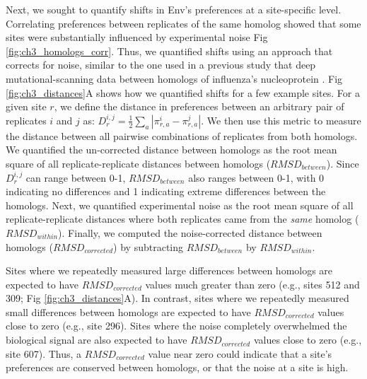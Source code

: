 \documentclass[9pt]{elife}
\begin{document}
Next, we sought to quantify shifts in Env's preferences at a site-specific level.
Correlating preferences between replicates of the same homolog showed that some sites were substantially influenced by experimental noise Fig \ref{fig:ch3_homologs_corr}.
Thus, we quantified shifts using an approach that corrects for noise, similar to the one used in a previous study that deep mutational-scanning data between homologs of influenza's nucleoprotein \cite{doud2015site}.
Fig \ref{fig:ch3_distances}A shows how we quantified shifts for a few example sites.
For a given site $r$, we define the distance in preferences between an arbitrary pair of replicates $i$ and $j$ as: $D_{r}^{i,j} = \frac{1}{2}\sum_{a}|\pi_{r,a}^{i}-\pi_{r,a}^{j}|$.
We then use this metric to measure the distance between all pairwise combinations of replicates from both homologs.
We quantified the un-corrected distance between homologs as the root mean square of all replicate-replicate distances between homologs ($RMSD_{between}$).
Since $D_{r}^{i,j}$ can range between 0-1, $RMSD_{between}$ also ranges between 0-1, with 0 indicating no differences and 1 indicating extreme differences between the homologs.
Next, we quantified experimental noise as the root mean square of all replicate-replicate distances where both replicates came from the \textit{same} homolog ($RMSD_{within}$).
Finally, we computed the noise-corrected distance between homologs ($RMSD_{corrected}$) by subtracting $RMSD_{between}$ by $RMSD_{within}$.

Sites where we repeatedly measured large differences between homologs are expected to have $RMSD_{corrected}$ values much greater than zero (e.g., sites 512 and 309; Fig \ref{fig:ch3_distances}A).
In contrast, sites where we repeatedly measured small differences between homologs are expected to have $RMSD_{corrected}$ values close to zero (e.g., site 296).
Sites where the noise completely overwhelmed the biological signal are also expected to have $RMSD_{corrected}$ values close to zero (e.g., site 607).
Thus, a $RMSD_{corrected}$ value near zero could indicate that a site's preferences are conserved between homologs, or that the noise at a site is high.
\end{document}
